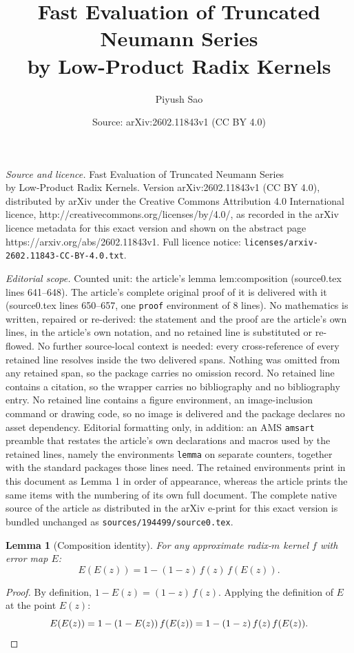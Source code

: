 \documentclass[10pt,a4paper]{amsart}
\title{Fast Evaluation of Truncated Neumann Series\\ by Low-Product Radix Kernels}
\author{Piyush Sao}
\date{Source: arXiv:2602.11843v1 (CC BY 4.0)}
\newtheorem{lemma}{Lemma}
\begin{document}
\maketitle

\noindent\emph{Source and licence.} Fast Evaluation of Truncated Neumann Series\\ by Low-Product Radix Kernels. Version arXiv:2602.11843v1 (CC BY 4.0), distributed by arXiv under the Creative Commons Attribution 4.0 International licence, http://creativecommons.org/licenses/by/4.0/, as recorded in the arXiv licence metadata for this exact version and shown on the abstract page https://arxiv.org/abs/2602.11843v1. Full licence notice: \texttt{licenses/arxiv-2602.11843-CC-BY-4.0.txt}.\par\smallskip

\noindent\textit{Editorial scope.} Counted unit: the article's lemma lem:composition (source0.tex lines 641--648). The article's complete original proof of it is delivered with it (source0.tex lines 650--657, one \texttt{proof} environment of 8 lines). No mathematics is written, repaired or re-derived: the statement and the proof are the article's own lines, in the article's own notation, and no retained line is substituted or re-flowed.  No further source-local context is needed: every cross-reference of every retained line resolves inside the two delivered spans.  Nothing was omitted from any retained span, so the package carries no omission record.  No retained line contains a citation, so the wrapper carries no bibliography and no bibliography entry.  No retained line contains a figure environment, an image-inclusion command or drawing code, so no image is delivered and the package declares no asset dependency.  Editorial formatting only, in addition: an AMS \texttt{amsart} preamble that restates the article's own declarations and macros used by the retained lines, namely the environments \texttt{lemma} on separate counters, together with the standard packages those lines need.  The retained environments print in this document as Lemma 1 in order of appearance, whereas the article prints the same items with the numbering of its own full document.  The complete native source of the article as distributed in the arXiv e-print for this exact version is bundled unchanged as \texttt{sources/194499/source0.tex}.
\begin{lemma}[Composition identity]
  \label{lem:composition}
  For any approximate radix-$m$ kernel $f$ with error map $E$:
  \begin{equation}
    \label{eq:composition}
    E(E(z)) = 1 - (1-z)\,f(z)\,f(E(z)).
  \end{equation}
\end{lemma}

\begin{proof}
  By definition, $1 - E(z) = (1-z)\,f(z)$. Applying the definition
  of $E$ at the point $E(z)$:
  \[
    E(E(z)) = 1 - (1-E(z))\,f(E(z)) = 1 - (1-z)\,f(z)\,f(E(z)).
    \qedhere
  \]
\end{proof}
\end{document}

